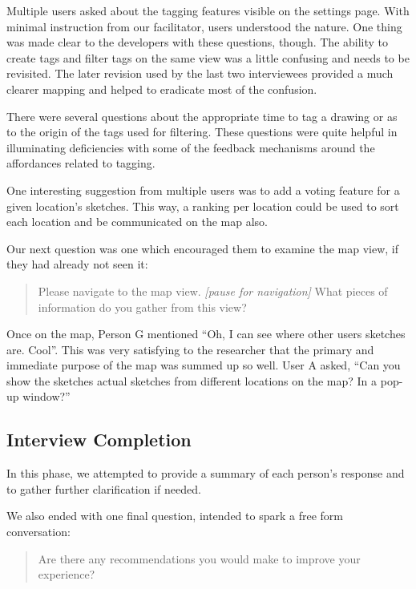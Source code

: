 \documentclass{chi2009}
\begin{document}
Multiple users asked about the tagging features visible on the settings page.
With minimal instruction from our facilitator, users understood the nature.
One thing was made clear to the developers with these questions, though.  The
ability to create tags and filter tags on the same view was a little confusing
and needs to be revisited.  The later revision used by the last two
interviewees provided a much clearer mapping and helped to eradicate most of
the confusion.

There were several questions about the appropriate time to tag a drawing or as
to the origin of the tags used for filtering.  These questions were quite
helpful in illuminating deficiencies with some of the feedback mechanisms
around the affordances related to tagging.

One interesting suggestion from multiple users was to add a voting feature for
a given location's sketches.  This way, a ranking per location could be used to
sort each location and be communicated on the map also.

Our next question was one which encouraged them to examine the map view, if
they had already not seen it:

\begin{quote}
Please navigate to the map view. {\it [pause for navigation]}
What pieces of information do you gather from this view?
\end{quote}

Once on the map, Person G mentioned ``Oh, I can see where other users sketches
are.  Cool''.  This was very satisfying to the researcher that the primary and
immediate purpose of the map was summed up so well.  User A asked, ``Can you 
show the sketches actual sketches from different locations on the map? In a
pop-up window?''


\subsection{Interview Completion}

In this phase, we attempted to provide a summary of each person's response and
to gather further clarification if needed.

We also ended with one final question, intended to spark a free form conversation:

\begin{quote}
Are there any recommendations you would make to improve your experience?
\end{quote}
\end{document}
